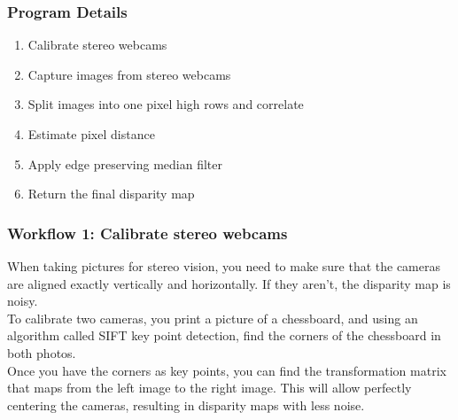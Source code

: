 \documentclass[19pt]{beamer}
\begin{document}
\begin{frame}
\frametitle{Program Details}
\begin{enumerate}
    \item Calibrate stereo webcams\\[10pt]
    \item Capture images from stereo webcams\\[10pt]
    \item Split images into one pixel high rows and correlate\\[10pt]
    \item Estimate pixel distance\\[10pt]
    \item Apply edge preserving median filter\\[10pt]
    \item Return the final disparity map 
\end{enumerate}
\end{frame}


\begin{frame}
\frametitle{Workflow 1: Calibrate stereo webcams}

When taking pictures for stereo vision, you need to make sure that the cameras are aligned exactly vertically and horizontally. If they aren't, the disparity map is noisy.\\[10pt]
%
To calibrate two cameras, you print a picture of a chessboard, and using an algorithm called SIFT key point detection, find the corners of the chessboard in both photos.\\[10pt]
%
Once you have the corners as key points, you can find the transformation matrix that maps from the left image to the right image. This will allow perfectly centering the cameras, resulting in  disparity maps with less noise.
\end{frame}
\end{document}
